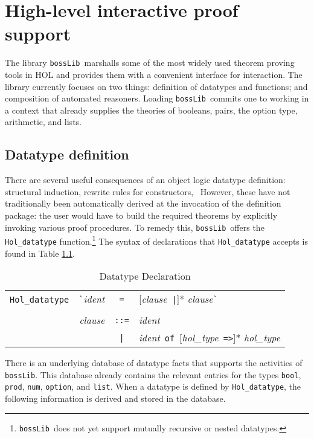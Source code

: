 \documentclass[12pt,fleqn,a4paper]{report}
\newcommand{\ident}      {\mbox{\it ident}}
\newcommand{\clause}      {\mbox{\it clause}}
\newcommand{\type}       {\mbox{\it hol\_type}}
\begin{document}
\chapter{High-level interactive proof support}\label{bossLib}

\newcommand\bossLib{{\tt bossLib}}
The library \bossLib\ marshalls some of the most widely used
theorem proving tools in HOL and provides them with a convenient
interface for interaction. The library currently focuses on two things:
definition of datatypes and functions; and composition of automated
reasoners. Loading \bossLib\ commits one to working in a context
that already supplies the theories of booleans, pairs, the option type,
arithmetic, and lists.

\section{Datatype definition}

There are several useful consequences of an object logic datatype
definition: structural induction, rewrite rules for constructors, \etc\
However, these have not traditionally been automatically derived
at the invocation of the definition package: the user would have to
build the required theorems by explicitly invoking various proof
procedures.  To remedy this, \bossLib\ offers the
\verb+Hol_datatype+ function.\footnote{\bossLib\ does not yet
support mutually recursive or nested datatypes.} The syntax of
declarations that \verb+Hol_datatype+ accepts is found in Table
\ref{datatype}.
\begin{table}[h]
\begin{center}
\begin{tabular}{|rcl|} \hline
\verb+Hol_datatype +\ \verb+`+\ident & \verb+=+ & [\clause\ \verb+|+]* \clause\verb+`+ \\
       & & \\
\clause & \verb+::=+ & \ident \\
        & \verb+|+ & \ident\ \verb+of+\ [\type\ \verb+=>+]* \type\\ \hline
\end{tabular}
\caption{Datatype Declaration}\label{datatype}
\end{center}
\end{table}

There is an underlying database of datatype facts that supports the
activities of \verb+bossLib+. This database already contains the
relevant entries for the types \verb+bool+, \verb+prod+, \verb+num+,
\verb+option+, and \verb+list+.  When a datatype is defined by
\verb+Hol_datatype+, the following information is derived and stored in
the database.
\end{document}
